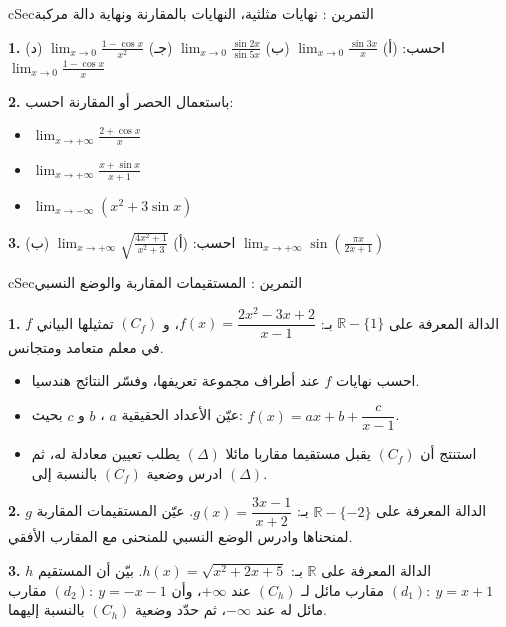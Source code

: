 \documentclass[12pt,a4paper]{article}
\newenvironment{BOX}[2]{\begin{otherlanguage}{english}\begin{arbox}{#1}{#2}}{\end{arbox}\end{otherlanguage}}
\newcounter{exo}
\newenvironment{tamrin}[1]{\stepcounter{exo}\begin{BOX}{cSec}{التمرين \theexo: #1}}{\end{BOX}}
\newcommand{\R}{\mathbb{R}}
\newenvironment{sq}{\begin{itemize}[leftmargin=2.4em,itemsep=3pt]}{\end{itemize}}
\newcommand{\qa}{\item[(أ)]}\newcommand{\qb}{\item[(ب)]}\newcommand{\qc}{\item[(جـ)]}\newcommand{\qd}{\item[(د)]}\newcommand{\qe}{\item[(هـ)]}
\newcommand{\QQ}[1]{\par\smallskip\textbf{#1.} }
\begin{document}
\begin{tamrin}{نهايات مثلثية، النهايات بالمقارنة ونهاية دالة مركبة}
\QQ{1} احسب: \quad (أ) $\displaystyle\lim_{x\to0}\frac{\sin 3x}{x}$ \qquad (ب) $\displaystyle\lim_{x\to0}\frac{\sin 2x}{\sin 5x}$ \qquad (جـ) $\displaystyle\lim_{x\to0}\frac{1-\cos x}{x^{2}}$ \qquad (د) $\displaystyle\lim_{x\to0}\frac{1-\cos x}{x}$
\QQ{2} باستعمال الحصر أو المقارنة احسب:
\begin{sq}
\qa $\displaystyle\lim_{x\to+\infty}\frac{2+\cos x}{x}$
\qb $\displaystyle\lim_{x\to+\infty}\frac{x+\sin x}{x+1}$
\qc $\displaystyle\lim_{x\to-\infty}\left(x^{2}+3\sin x\right)$
\end{sq}
\QQ{3} احسب: \quad (أ) $\displaystyle\lim_{x\to+\infty}\sqrt{\frac{4x^{2}+1}{x^{2}+3}}$ \qquad (ب) $\displaystyle\lim_{x\to+\infty}\sin\left(\frac{\pi x}{2x+1}\right)$
\end{tamrin}

\begin{tamrin}{المستقيمات المقاربة والوضع النسبي}
\QQ{1} $f$ الدالة المعرفة على $\R-\{1\}$ بـ: $f(x)=\dfrac{2x^{2}-3x+2}{x-1}$، و $(C_f)$ تمثيلها البياني في معلم متعامد ومتجانس.
\begin{sq}
\qa احسب نهايات $f$ عند أطراف مجموعة تعريفها، وفسّر النتائج هندسيا.
\qb عيّن الأعداد الحقيقية $a$ ، $b$ و $c$ بحيث: $f(x)=ax+b+\dfrac{c}{x-1}$.
\qc استنتج أن $(C_f)$ يقبل مستقيما مقاربا مائلا $(\Delta)$ يطلب تعيين معادلة له، ثم ادرس وضعية $(C_f)$ بالنسبة إلى $(\Delta)$.
\end{sq}
\QQ{2} $g$ الدالة المعرفة على $\R-\{-2\}$ بـ: $g(x)=\dfrac{3x-1}{x+2}$. عيّن المستقيمات المقاربة لمنحناها وادرس الوضع النسبي للمنحنى مع المقارب الأفقي.
\QQ{3} $h$ الدالة المعرفة على $\R$ بـ: $h(x)=\sqrt{x^{2}+2x+5}$. بيّن أن المستقيم $(d_1):\ y=x+1$ مقارب مائل لـ $(C_h)$ عند $+\infty$، وأن $(d_2):\ y=-x-1$ مقارب مائل له عند $-\infty$، ثم حدّد وضعية $(C_h)$ بالنسبة إليهما.
\end{tamrin}
\end{document}
